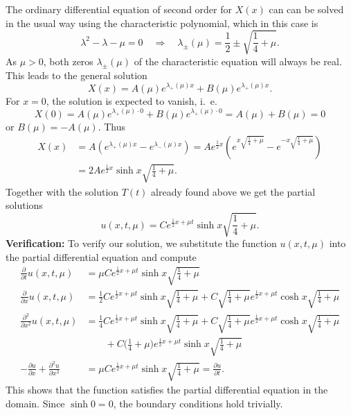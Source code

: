 \begin{loesung}
\begin{teilaufgaben}
The ordinary differential equation of second order for $X(x)$ can
can be solved in the usual way using the characteristic polynomial,
which in this case is
\[
\lambda^2-\lambda-\mu=0
\quad
\Rightarrow
\quad
\lambda_{\pm}(\mu)=\frac12\pm\sqrt{\frac14+\mu}.
\]
As $\mu>0$, both zeros $\lambda_{\pm}(\mu)$ of the characteristic
equation will always be real.
This leads to the general solution
\[
X(x)=
A(\mu)e^{\lambda_+(\mu)x}
+
B(\mu)e^{\lambda_+(\mu)x}.
\]
For $x=0$, the solution is expected to vanish, i.~e.
\[
X(0)=
A(\mu)e^{\lambda_+(\mu)\cdot 0}
+
B(\mu)e^{\lambda_+(\mu)\cdot 0}
=A(\mu)+B(\mu)=0
\]
or $B(\mu)=-A(\mu)$.
Thus
\begin{align*}
X(x)&=A(e^{\lambda_+(\mu)x}-e^{\lambda_-(\mu)x})
=Ae^{\frac12x}\left(
e^{x\sqrt{\frac14+\mu}}
-
e^{-x\sqrt{\frac14+\mu}}
\right)
\\
&=2Ae^{\frac12x}\sinh x\sqrt{\frac14+\mu}.
\end{align*}
Together with the solution $T(t)$ already found above we get the
partial solutions
\[
u(x,t,\mu)=
Ce^{\frac12x+\mu t}\sinh x\sqrt{\frac14+\mu}.
\]
{\bf Verification:}
To verify our solution, we substitute the function $u(x,t,\mu)$
into the partial differential equation and compute
\begin{align*}
\frac{\partial}{\partial t}u(x,t,\mu)&=
\mu Ce^{\frac12x+\mu t}\sinh x\sqrt{\frac14+\mu}
\\
\frac{\partial}{\partial x}u(x,t,\mu)&=
\frac12
Ce^{\frac12x+\mu t}\sinh x\sqrt{\frac14+\mu}
+
C\sqrt{\frac14+\mu}e^{\frac12x+\mu t}\cosh x\sqrt{\frac14+\mu}
\\
\frac{\partial^2}{\partial x^2}u(x,t,\mu)&=
\frac14
Ce^{\frac12x+\mu t}\sinh x\sqrt{\frac14+\mu}
+
C\sqrt{\frac14+\mu}e^{\frac12x+\mu t}\cosh x\sqrt{\frac14+\mu}
\\
&\qquad +
C\biggl(\frac14+\mu\biggr)e^{\frac12x+\mu t}\sinh x\sqrt{\frac14+\mu}
\\
-\frac{\partial u}{\partial x}
+
\frac{\partial^2 u}{\partial x^2}
&=
\mu Ce^{\frac12x+\mu t}\sinh x\sqrt{\frac14+\mu}
=
\frac{\partial u}{\partial t}.
\end{align*}
This shows that the function satisfies the partial differential
equation in the domain.
Since $\sinh 0=0$, the boundary conditions hold trivially.
\qedhere
\end{teilaufgaben}
\end{loesung}
